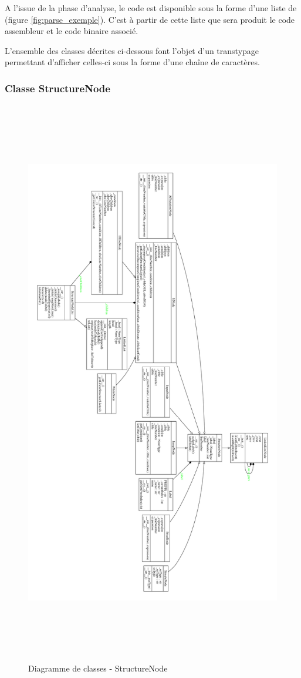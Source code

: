 A l'issue de la phase d'analyse, le code est disponible sous la forme d'une liste de  (figure \ref{fig:parse_exemple}). C'est à partir de cette liste que sera produit le code assembleur et le code binaire associé.

L'ensemble des classes décrites ci-dessous font l'objet d'un transtypage permettant d'afficher celles-ci sous la forme d'une chaîne de caractères. 

\subsubsection{Classe StructureNode}

\begin{figure}
	\centering
	\includegraphics[height=25cm]{./Pictures/StructureNode.pdf}
	\caption{\label{fig:class_StructureNode}Diagramme de classes - StructureNode}
\end{figure}

